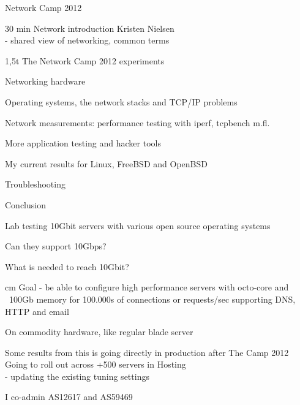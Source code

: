 \documentclass[20pt,landscape,a4paper,footrule]{foils}
\begin{document}
{Network Camp 2012}



\begin{list1}
\item 30 min Network introduction Kristen Nielsen\\
- shared view of networking, common terms
\item 1,5t The Network Camp 2012 experiments
\item Networking hardware
\item Operating systems, the network stacks and TCP/IP problems
\item Network measurements: performance testing with iperf, tcpbench m.fl.
\item More application testing and hacker tools 
\item My current results for Linux, FreeBSD and OpenBSD
\item Troubleshooting
\item Conclusion
\end{list1}

\hlkprofiluk


Lab testing 10Gbit servers with various open source operating systems

Can they support 10Gbps?

What is needed to reach 10Gbit?

 cm
Goal - be able to configure high performance servers with octo-core and ~100Gb memory for 100.000s of connections or requests/sec supporting DNS, HTTP and email

On commodity hardware, like regular blade server

Some results from this is going directly in production after The Camp 2012\\
Going to roll out across +500 servers in Hosting\\
- updating the existing tuning settings


\vskip 1cm
\begin{center}
	I co-admin AS12617 and AS59469
	
 
\end{center}

\end{document}

